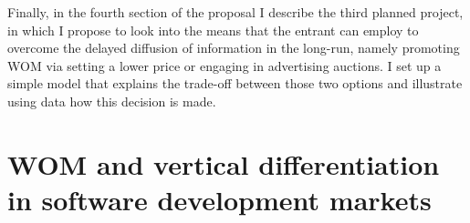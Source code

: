 \documentclass{article}
\numberwithin{figure}{section}
\numberwithin{table}{section}
\theoremstyle{indented}
\numberwithin{equation}{section} %
\begin{document}
Finally, in the fourth section of the proposal I describe the third planned project, in which I propose to look into the means that the entrant can employ to overcome the delayed diffusion of information in the long-run, namely promoting WOM via setting a lower price or engaging in advertising auctions. I set up a simple model that explains the trade-off between those two options and illustrate using data how this decision is made. 






\setcounter{tocdepth}{2}
\addtocounter{page}{-1}


\section{WOM and vertical differentiation in software development markets}
\end{document}
